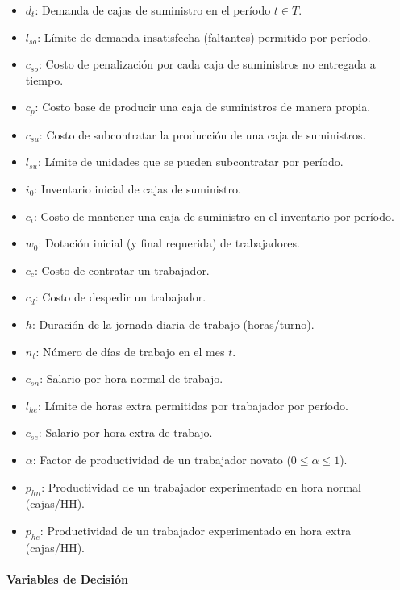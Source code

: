 \documentclass[
]{article}
\providecommand{\tightlist}{%
  \setlength{\itemsep}{0pt}\setlength{\parskip}{0pt}}
\begin{document}
\begin{itemize}
\tightlist
\item
  \(d_t\): Demanda de cajas de suministro en el período \(t \in T\).
\item
  \(l_{so}\): Límite de demanda insatisfecha (faltantes) permitido por
  período.
\item
  \(c_{so}\): Costo de penalización por cada caja de suministros no
  entregada a tiempo.
\item
  \(c_p\): Costo base de producir una caja de suministros de manera
  propia.
\item
  \(c_{su}\): Costo de subcontratar la producción de una caja de
  suministros.
\item
  \(l_{su}\): Límite de unidades que se pueden subcontratar por período.
\item
  \(i_0\): Inventario inicial de cajas de suministro.
\item
  \(c_i\): Costo de mantener una caja de suministro en el inventario por
  período.
\item
  \(w_0\): Dotación inicial (y final requerida) de trabajadores.
\item
  \(c_c\): Costo de contratar un trabajador.
\item
  \(c_d\): Costo de despedir un trabajador.
\item
  \(h\): Duración de la jornada diaria de trabajo (horas/turno).
\item
  \(n_t\): Número de días de trabajo en el mes \(t\).
\item
  \(c_{sn}\): Salario por hora normal de trabajo.
\item
  \(l_{he}\): Límite de horas extra permitidas por trabajador por
  período.
\item
  \(c_{se}\): Salario por hora extra de trabajo.
\item
  \(\alpha\): Factor de productividad de un trabajador novato
  (\(0 \le \alpha \le 1\)).
\item
  \(p_{hn}\): Productividad de un trabajador experimentado en hora
  normal (cajas/HH).
\item
  \(p_{he}\): Productividad de un trabajador experimentado en hora extra
  (cajas/HH).
\end{itemize}

\hypertarget{variables-de-decisiuxf3n}{%
\paragraph{Variables de Decisión}\label{variables-de-decisiuxf3n}}
\end{document}
